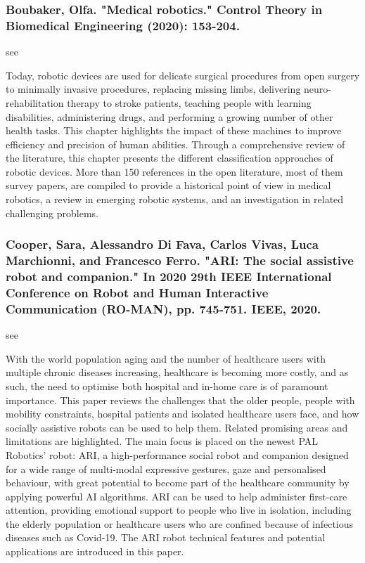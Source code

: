 \documentclass[conference]{IEEEtran}
\begin{document}
\medskip
\subsubsection{Boubaker, Olfa. "Medical robotics." Control Theory in Biomedical Engineering (2020): 153-204.}
see \cite{boubaker2020medical}

Today, robotic devices are used for delicate surgical procedures from open surgery to minimally invasive procedures, replacing missing limbs, delivering neuro-rehabilitation therapy to stroke patients, teaching people with learning disabilities, administering drugs, and performing a growing number of other health tasks. This chapter highlights the impact of these machines to improve efficiency and precision of human abilities. Through a comprehensive review of the literature, this chapter presents the different classification approaches of robotic devices. More than 150 references in the open literature, most of them survey papers, are compiled to provide a historical point of view in medical robotics, a review in emerging robotic systems, and an investigation in related challenging problems.

\medskip
\subsubsection{Cooper, Sara, Alessandro Di Fava, Carlos Vivas, Luca Marchionni, and Francesco Ferro. "ARI: The social assistive robot and companion." In 2020 29th IEEE International Conference on Robot and Human Interactive Communication (RO-MAN), pp. 745-751. IEEE, 2020.}
see \cite{cooper2020ari}

With the world population aging and the number of healthcare users with multiple chronic diseases increasing, healthcare is becoming more costly, and as such, the need to optimise both hospital and in-home care is of paramount importance. This paper reviews the challenges that the older people, people with mobility constraints, hospital patients and isolated healthcare users face, and how socially assistive robots can be used to help them. Related promising areas and limitations are highlighted. The main focus is placed on the newest PAL Robotics' robot: ARI, a high-performance social robot and companion designed for a wide range of multi-modal expressive gestures, gaze and personalised behaviour, with great potential to become part of the healthcare community by applying powerful AI algorithms. ARI can be used to help administer first-care attention, providing emotional support to people who live in isolation, including the elderly population or healthcare users who are confined because of infectious diseases such as Covid-19. The ARI robot technical features and potential applications are introduced in this paper.
\end{document}
